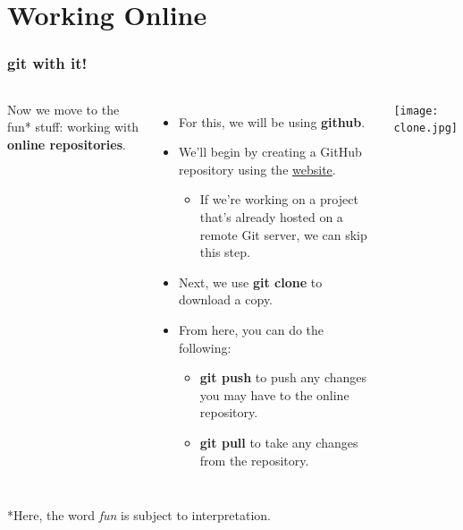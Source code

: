 \documentclass{beamer}
\begin{document}
\section{Working Online}

\begin{frame}
\frametitle{\textbf{git} with it!}
\begin{columns}
Now we move to the fun* stuff: working with \textbf{online repositories}.
\begin{itemize}
\item For this, we will be using \textbf{github}.
\item We'll begin by creating a GitHub repository using the \href{www.github.com}{website}.
\begin{itemize}
\item If we're working on a project that's already hosted on a remote Git server, we can skip this step.
\end{itemize}
\item Next, we use \textbf{git clone} to download a copy.
\item From here, you can do the following:
\begin{itemize}
\item \textbf{git push} to push any changes you may have to the online repository.
\item \textbf{git pull} to take any changes from the repository.
\end{itemize}
\end{itemize}
\texttt{[image: clone.jpg]}
\end{columns}

*Here, the word \textit{fun} is subject to interpretation.
\end{frame}
\end{document}
